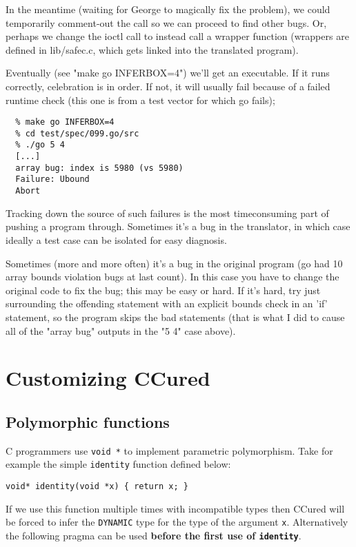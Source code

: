 \documentclass{book}
\def\t#1{{\tt #1}}
\begin{document}
In the meantime (waiting for George to magically fix the problem), we
could temporarily comment-out the call so we can proceed to find other
bugs.  Or, perhaps we change the ioctl call to instead call a wrapper
function (wrappers are defined in lib/safec.c, which gets linked into
the translated program).

Eventually (see "make go INFERBOX=4") we'll get an executable.  If it
runs correctly, celebration is in order.  If not, it will usually fail
because of a failed runtime check (this one is from a test vector for
which go fails);

\begin{verbatim}
  % make go INFERBOX=4
  % cd test/spec/099.go/src
  % ./go 5 4
  [...]
  array bug: index is 5980 (vs 5980)
  Failure: Ubound
  Abort
\end{verbatim}

Tracking down the source of such failures is the most timeconsuming
part of pushing a program through.  Sometimes it's a bug in the
translator, in which case ideally a test case can be isolated for easy
diagnosis.  

Sometimes (more and more often) it's a bug in the original program (go
had 10 array bounds violation bugs at last count).  In this case you
have to change the original code to fix the bug; this may be easy or
hard.  If it's hard, try just surrounding the offending statement with
an explicit bounds check in an 'if' statement, so the program skips
the bad statements (that is what I did to cause all of the "array bug"
outputs in the "5 4" case above).

\chapter{Customizing CCured}

  \section{Polymorphic functions}

 C programmers use \t{void *} to implement parametric polymorphism. Take for
example the simple \t{identity} function defined below:

\begin{verbatim}
void* identity(void *x) { return x; }
\end{verbatim}

 If we use this function multiple times with incompatible types then CCured
will be forced to infer the \t{DYNAMIC} type for the type of the argument
\t{x}. Alternatively the following pragma can be used {\bf before the first
use of \t{identity}}. 
\end{document}
